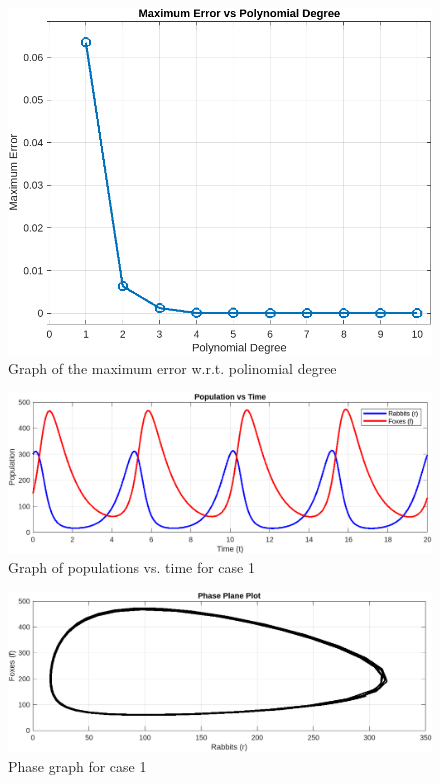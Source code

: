 \documentclass[a4paper, oneside]{article}
\begin{document}
\begin{figure}[h!]
    \centering
    \includegraphics[width=\textwidth]{resources/max-error-vs-polinom-degree.png}
    \caption{Graph of the maximum error w.r.t. polinomial degree}
    \label{fig:max-error-vs-polinom-degree}
\end{figure}
\begin{figure}[h!]
    \centering
    \includegraphics[width=\textwidth]{resources/pop-vs-time-1.png}
    \caption{Graph of populations vs. time for case 1}
    \label{fig:pop-vs-time-1}
\end{figure}
\begin{figure}[h!]
    \centering
    \includegraphics[width=\textwidth]{resources/phase-1.png}
    \caption{Phase graph for case 1}
    \label{fig:phase-1}
\end{figure}
\end{document}

